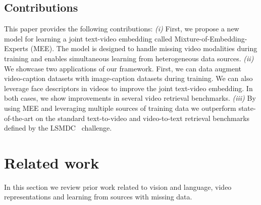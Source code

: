\documentclass[runningheads]{llncs}
\begin{document}
\subsection{Contributions}
This paper provides the following contributions: \textit{(i)} First, we propose a new model for learning a joint text-video embedding called Mixture-of-Embedding-Experts (MEE).
The model is designed to handle missing video modalities during training and enables simultaneous learning from heterogeneous data sources.
\textit{(ii)} We showcase two applications of our framework. First, we can data augment video-caption datasets with image-caption datasets during training. We can also leverage face descriptors in videos to improve the joint text-video embedding. In both cases, we show improvements in several video retrieval benchmarks.
\textit{(iii)} By using MEE and leveraging multiple sources of training data we outperform state-of-the-art on the standard text-to-video and video-to-text retrieval benchmarks defined by the LSMDC~\cite{rohrbach15dataset} challenge.

\section{Related work}
In this section we review prior work related to vision and language, video representations and learning from sources with missing data.
\end{document}
